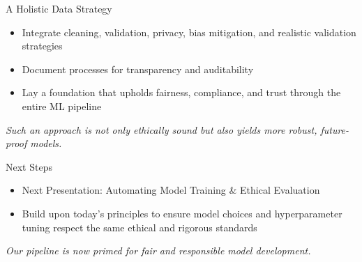 \documentclass[aspectratio=169]{beamer}
\begin{document}
%

\begin{frame}{A Holistic Data Strategy}
\begin{itemize}
\item Integrate cleaning, validation, privacy, bias mitigation, and realistic validation strategies
\item Document processes for transparency and auditability
\item Lay a foundation that upholds fairness, compliance, and trust through the entire ML pipeline
\end{itemize}

\emph{Such an approach is not only ethically sound but also yields more robust, future-proof models.}
\end{frame}


\begin{frame}{Next Steps}
\begin{itemize}
\item Next Presentation: Automating Model Training \& Ethical Evaluation
\item Build upon today’s principles to ensure model choices and hyperparameter tuning respect the same ethical and rigorous standards
\end{itemize}

\emph{Our pipeline is now primed for fair and responsible model development.}
\end{frame}
\end{document}
